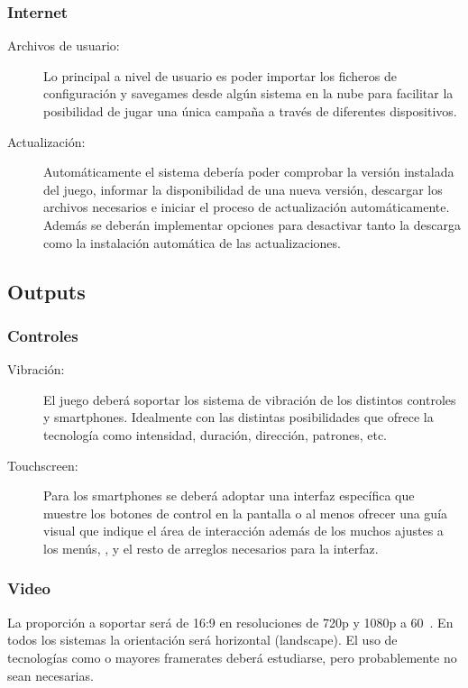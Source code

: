 \subsubsection{Internet}
\begin{description}
\item[Archivos de usuario:] Lo principal a nivel de usuario es poder importar los ficheros de configuración y savegames desde algún sistema en la nube para facilitar la posibilidad de jugar una única campaña a través de diferentes dispositivos.

\item[Actualización:] Automáticamente el sistema debería poder comprobar la versión instalada del juego, informar la disponibilidad de una nueva versión, descargar los archivos necesarios e iniciar el proceso de actualización automáticamente. Además se deberán implementar opciones para desactivar tanto la descarga como la instalación automática de las actualizaciones.
\end{description}

\subsection{Outputs}

\subsubsection{Controles}
\begin{description}
\item[Vibración:] El juego deberá soportar los sistema de vibración de los distintos controles y smartphones. Idealmente con las distintas posibilidades que ofrece la tecnología como intensidad, duración, dirección, patrones, etc.

\item[Touchscreen:] Para los smartphones se deberá adoptar una interfaz específica que muestre los botones de control en la pantalla o al menos ofrecer una guía visual que indique el área de interacción además de los muchos ajustes a los menús, , y el resto de arreglos necesarios para la interfaz.
\end{description}

\subsubsection{Video}
La proporción a soportar será de 16:9 en resoluciones de 720p y 1080p a 60~. En todos los sistemas la orientación será horizontal (landscape). El uso de tecnologías como  o mayores framerates deberá estudiarse, pero probablemente no sean necesarias.

